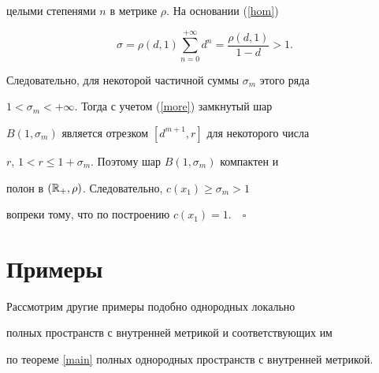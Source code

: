 целыми степенями $n$ в метрике $\rho$. На основании (\ref{hom})


$$


\sigma=\rho(d,1)\sum_{n=0}^{+\infty}d^{n}=\frac{\rho(d,1)}{1-d}>1.


$$


Следовательно, для некоторой частичной суммы $\sigma_{m}$ этого ряда


$1<\sigma_{m}<+\infty$. Тогда с учетом (\ref{more}) замкнутый шар


$B(1,\sigma_{m})$ является отрезком $[d^{m+1},r]$ для некоторого числа


$r$, $1<r \leq 1+\sigma_{m}$. Поэтому шар $B(1,\sigma_{m})$ компактен и


полон в $(\Bbb{R}_{+},\rho)$. Следовательно, $c(x_{1}) \geq \sigma_{m}>1$


вопреки тому, что по построению $c(x_{1})=1$.$\quad\square$








\section{Примеры}





Рассмотрим другие примеры подобно однородных локально


полных пространств с внутренней метрикой и соответствующих им


по теореме \ref{main} полных однородных пространств с внутренней метрикой.





